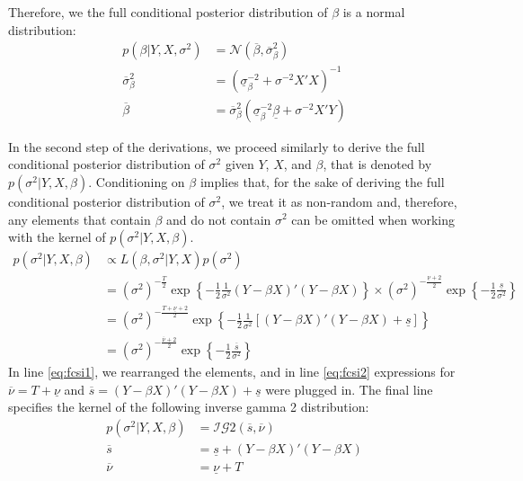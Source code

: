 \documentclass[
  letterpaper,
  DIV=11,
  numbers=noendperiod]{scrreprt}
\begin{document}
Therefore, we the full conditional posterior distribution of \(\beta\)
is a normal distribution: \begin{align} 
p\left(\beta|Y,X,\sigma^2\right) &=\mathcal{N}\left(\overline{\beta}, \overline{\sigma}_{\beta}^2\right)\\
\overline{\sigma}_{\beta}^2 &= \left( \underline{\sigma}_{\beta}^{-2}+ \sigma^{-2}X'X \right)^{-1}\\
\overline{\beta} &= \overline{\sigma}_{\beta}^2\left( \underline{\sigma}_{\beta}^{-2}\underline{\beta} + \sigma^{-2}X'Y \right)
\end{align}

In the second step of the derivations, we proceed similarly to derive
the full conditional posterior distribution of \(\sigma^2\) given \(Y\),
\(X\), and \(\beta\), that is denoted by
\(p\left(\sigma^2|Y,X,\beta\right)\). Conditioning on \(\beta\) implies
that, for the sake of deriving the full conditional posterior
distribution of \(\sigma^2\), we treat it as non-random and, therefore,
any elements that contain \(\beta\) and do not contain \(\sigma^2\) can
be omitted when working with the kernel of
\(p\left(\sigma^2|Y,X,\beta\right)\). \begin{align} 
p\left(\sigma^2|Y,X,\beta\right) &\propto L\left(\beta,\sigma^2|Y,X\right)p\left(\sigma^2\right)\\
&= \left( \sigma^2 \right)^{-\frac{T}{2}}\exp\left\{ -\frac{1}{2}\frac{1}{\sigma^2}(Y-\beta X)'(Y-\beta X) \right\} \times
\left(\sigma^2\right)^{-\frac{\underline{\nu}+2}{2}}\exp\left\{ -\frac{1}{2}\frac{\underline{s}}{\sigma^2} \right\}\\
&= \left( \sigma^2 \right)^{-\frac{T+\underline{\nu}+2}{2}}\exp\left\{ -\frac{1}{2}\frac{1}{\sigma^2}\left[(Y-\beta X)'(Y-\beta X) + \underline{s} \right]\right\}\label{eq:fcsi1}\\
&= \left( \sigma^2 \right)^{-\frac{\overline{\nu}+2}{2}}\exp\left\{ -\frac{1}{2}\frac{\overline{s}}{\sigma^2}\right\}\label{eq:fcsi2}
\end{align} In line \eqref{eq:fcsi1}, we rearranged the elements, and in
line \eqref{eq:fcsi2} expressions for
\(\overline{\nu} = T+\underline{\nu}\) and
\(\overline{s} = (Y-\beta X)'(Y-\beta X) + \underline{s}\) were plugged
in. The final line specifies the kernel of the following inverse gamma 2
distribution: \begin{align} 
p\left(\sigma^2|Y,X,\beta\right) &= \mathcal{IG}2\left( \overline{s}, \overline{\nu} \right)\\[1ex]
\overline{s} &= \underline{s} + (Y-\beta X)'(Y-\beta X) \\
\overline{\nu} &= \underline{\nu} +T 
\end{align}
\end{document}
